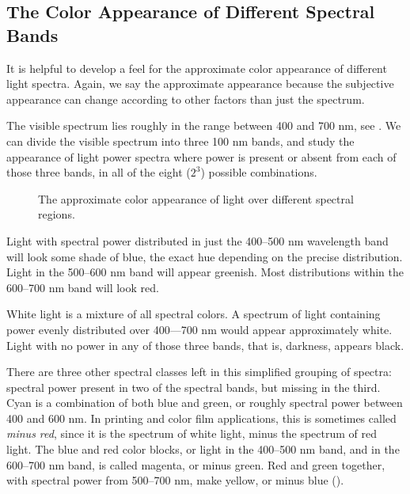 \subsection{The Color Appearance of Different Spectral Bands}

It is helpful to develop a feel for the approximate color appearance of different
light spectra.  Again, we say the approximate appearance because the subjective appearance can change according to other factors than just the spectrum.

The visible spectrum lies roughly in the range between 400 and 700 nm,
see \fig{\ref{fig:rainbow}}.  We can divide the visible spectrum into
three 100 nm bands, and study the appearance of light power
spectra where power is present or absent from each of those three
bands, in all of the eight ($2^3$) possible combinations.


\begin{figure}
\centerline{
}
\caption{The approximate color appearance of light over different
  spectral regions.}
\label{fig:rainbow}
\end{figure}

Light with spectral power distributed in just the 400--500 nm
wavelength band will look some shade of blue, the exact hue depending
on the precise distribution.  Light in the 500--600 nm band will
appear greenish.  Most distributions within the 600--700 nm band will
look red.

White light is a mixture of all spectral colors.  A spectrum of light
containing power evenly distributed over 400---700 nm would appear approximately
white.  Light with no power in any of those three bands, that is, 
darkness, appears black.

There are three other spectral classes left in this simplified grouping
of spectra:  spectral power present in two of the spectral
bands, but missing in the third.
Cyan is a combination of both blue and green, or roughly spectral
power between 400 and 600 nm.  In printing and color film
applications, this is sometimes called {\em minus red}, since it is the
spectrum of white light, minus the spectrum of red light.  The blue
and red color blocks, or light in the 400--500 nm band, and in the
600--700 nm band, is called magenta, or minus green.  Red and green together,
with spectral power from 500--700 nm, make yellow, or minus blue (\fig{\ref{fig:names}}). 

